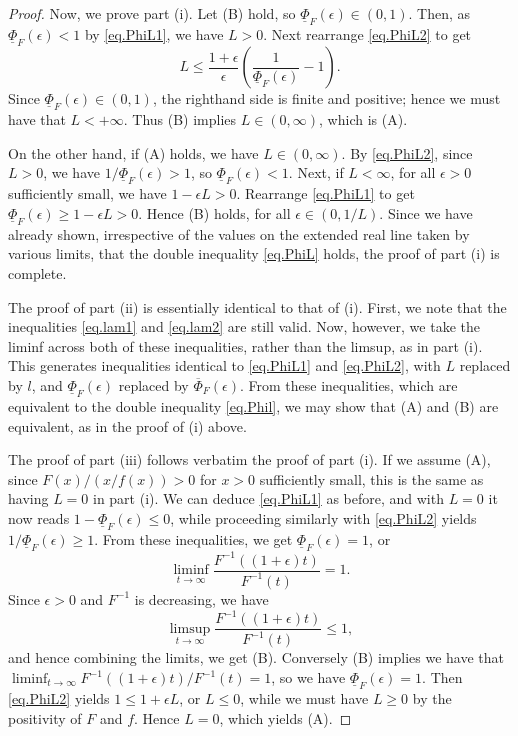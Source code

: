 \documentclass[a4paper,10pt,reqno]{amsart}
\numberwithin{equation}{section}
\theoremstyle{definition}
\theoremstyle{remark}
\DeclareMathOperator{\1}{\mathbbm 1}
\begin{document}
\begin{proof}
		Now, we prove part (i). Let (B) hold, so $\underline{\Phi}_F(\epsilon)\in (0,1)$. Then, as $\underline{\Phi}_F(\epsilon)<1$ by \eqref{eq.PhiL1}, we have $L>0$. Next rearrange \eqref{eq.PhiL2} to get  
		$$ 
		L\leq
		\frac{1+\epsilon}{\epsilon}\left( \frac{1}{\underline{\Phi}_F(\epsilon)} -1\right).
		$$
		Since $\underline{\Phi}_F(\epsilon)\in (0,1)$, the righthand side is finite and positive; hence we must have that $L<+\infty$. Thus (B) implies $L\in (0,\infty)$, which is (A). 
		
		On the other hand, if (A) holds, we have $L\in (0,\infty)$. By \eqref{eq.PhiL2}, since $L>0$, we have $	1/\underline{\Phi}_F(\epsilon)>1$, so $\underline{\Phi}_F(\epsilon)<1$. Next, if $L<\infty$, for all $\epsilon>0$ sufficiently small, we have $1-\epsilon L>0$. Rearrange \eqref{eq.PhiL1} to get $\underline{\Phi}_F(\epsilon)\geq 1-\epsilon L>0$. Hence (B) holds, for all $\epsilon\in (0,1/L)$. Since we have already shown, irrespective of the values on the extended real line taken by various limits, that the double inequality \eqref{eq.PhiL} holds, the proof of part (i) is complete. 
		
		The proof of part (ii) is essentially identical to that of (i). First, we note that the inequalities \eqref{eq.lam1} and \eqref{eq.lam2} are still valid. Now, however, we take the liminf across both of these inequalities, rather than the limsup, as in part (i). This generates inequalities identical to  \eqref{eq.PhiL1} and \eqref{eq.PhiL2}, with $L$ replaced by $l$, and $\underline{\Phi}_F(\epsilon)$ replaced by $\overline{\Phi}_F(\epsilon)$. From these inequalities, which are equivalent to the double inequality \eqref{eq.Phil}, we may show that (A) and (B) are equivalent, as in the proof of (i) above.
		
		The proof of part (iii) follows verbatim the proof of part (i). If we assume (A), since $F(x)/(x/f(x))>0$ for $x>0$ sufficiently small, this is the same as having $L=0$ in part (i). We can deduce \eqref{eq.PhiL1} as before, and with $L=0$ it now reads  $1-\underline{\Phi}_F(\epsilon)\leq 0$, while proceeding similarly with \eqref{eq.PhiL2} yields $1/\underline{\Phi}_F(\epsilon)\geq 1$. From these inequalities, we get $\underline{\Phi}_F(\epsilon)=1$, or 
		\[
		\liminf_{t\to\infty} \frac{F^{-1}((1+\epsilon)t)}{F^{-1}(t)}=1.
		\]
		Since $\epsilon>0$ and $F^{-1}$ is decreasing, we have 
		\[
		\limsup_{t\to\infty} \frac{F^{-1}((1+\epsilon)t)}{F^{-1}(t)}\leq 1,
		\]
		and hence combining the limits, we get (B). Conversely (B) implies we have that $\liminf_{t\to\infty}  F^{-1}((1+\epsilon)t)/F^{-1}(t)=1$, so we have $\underline{\Phi}_F(\epsilon)=1$. Then \eqref{eq.PhiL2} yields $1\leq 1+\epsilon L$, or $L\leq 0$, while we must have $L\geq 0$ by the positivity of $F$ and $f$. Hence $L=0$, which yields (A).
		

\end{proof}
\end{document}
